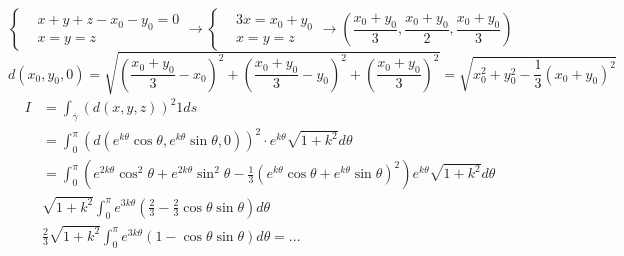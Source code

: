 \documentclass{article}
\begin{document}
\begin{equation*}
    \begin{cases}
    &x+y+z-x_0-y_0=0\\
    & x=y=z
\end{cases}\rightarrow \begin{cases}
    &3x = x_0+y_0\\
    &x=y=z
\end{cases}\rightarrow \left( \frac{x_0+y_0}{3},\frac{x_0+y_0}{2}, \frac{x_0+y_0}{3} \right)
\end{equation*}
\begin{equation*}
    d(x_0,y_0,0)=\sqrt{\left( \frac{x_0+y_0}{3}-x_0 \right)^2+\left( \frac{x_0+y_0}{3}-y_0 \right)^2 + \left( \frac{x_0+y_0}{3} \right)^2}=\sqrt{x_0^2+y_0^2-\frac{1}{3}(x_0+y_0)^2}
\end{equation*}
\begin{align*}
    I&=\int_{\overline{\gamma}}(d(x,y,z))^2 1 ds\\
    &= \int_0^{\pi} (d(e^{k\theta}\cos \theta, e^{k\theta}\sin \theta,0))^2\cdot e^{k\theta}\sqrt{1+k^2}d\theta\\
    &=\int_0^\pi \left( e^{2k\theta} \cos^2 \theta + e^{2k\theta}\sin^2 \theta - \frac{1}{3}\left( e^{k\theta}\cos \theta + e^{k\theta}\sin \theta \right)^2 \right)e^{k\theta} \sqrt{1+k^2}d\theta\\
    &\sqrt{1+k^2}\int_0^\pi e^{3k\theta} \left( \frac{2}{3}-\frac{2}{3}\cos\theta \sin \theta \right) d \theta\\
    &\frac{2}{3}\sqrt{1+k^2}\int_0^\pi e^{3k\theta} (1-\cos \theta \sin \theta) d\theta=...
\end{align*}
\end{document}
